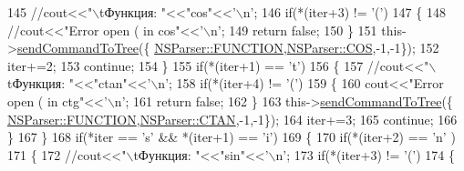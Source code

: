 \begin{DoxyCode}
145                         \textcolor{comment}{//cout<<"\(\backslash\)tФункция: "<<"cos"<<'\(\backslash\)n';}
146                         \textcolor{keywordflow}{if}(*(iter+3) != \textcolor{charliteral}{'('})
147                         \{
148                             \textcolor{comment}{//cout<<"Error open ( in cos"<<'\(\backslash\)n';}
149                             \textcolor{keywordflow}{return} \textcolor{keyword}{false};
150                         \}
151                         this->\hyperlink{classParser_ac61a1fedefe50ed900f0e65c029053c1}{sendCommandToTree}(\{
      \hyperlink{namespaceNSParser_aca012df556c0413c6166348fdd62c4eba4adabba7d2f386bba54639075a582a36}{NSParser::FUNCTION},\hyperlink{namespaceNSParser_aae20df1402d72f463a1a9efe3ce1a9b9ab07effe3bb5c293e74b3ffdf8910e9f7}{NSParser::COS},-1,-1\});
152                         iter+=2;
153                         \textcolor{keywordflow}{continue};
154                     \}
155                     \textcolor{keywordflow}{if}(*(iter+1) == \textcolor{charliteral}{'t'})
156                     \{
157                         \textcolor{comment}{//cout<<"\(\backslash\)tФункция: "<<"ctan"<<'\(\backslash\)n';}
158                         \textcolor{keywordflow}{if}(*(iter+4) != \textcolor{charliteral}{'('})
159                         \{
160                              cout<<\textcolor{stringliteral}{"Error open ( in ctg"}<<\textcolor{charliteral}{'\(\backslash\)n'};
161                              \textcolor{keywordflow}{return} \textcolor{keyword}{false};
162                         \}
163                         this->\hyperlink{classParser_ac61a1fedefe50ed900f0e65c029053c1}{sendCommandToTree}(\{
      \hyperlink{namespaceNSParser_aca012df556c0413c6166348fdd62c4eba4adabba7d2f386bba54639075a582a36}{NSParser::FUNCTION},\hyperlink{namespaceNSParser_aae20df1402d72f463a1a9efe3ce1a9b9a25ff62fb6a1e42f59f3b2a70d31ad875}{NSParser::CTAN},-1,-1\});
164                         iter+=3;
165                         \textcolor{keywordflow}{continue};
166                     \}
167                 \}
168                 \textcolor{keywordflow}{if}(*iter == \textcolor{charliteral}{'s'} && *(iter+1) == \textcolor{charliteral}{'i'})
169                 \{
170                     \textcolor{keywordflow}{if}(*(iter+2) == \textcolor{charliteral}{'n'} )
171                     \{
172                         \textcolor{comment}{//cout<<"\(\backslash\)tФункция: "<<"sin"<<'\(\backslash\)n';}
173                         \textcolor{keywordflow}{if}(*(iter+3) != \textcolor{charliteral}{'('})
174                         \{

\end{DoxyCode}
